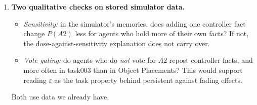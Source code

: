 \documentclass[10pt,a4paper]{article}
\begin{document}
\begin{enumerate}
\begin{itemize}
  \item \emph{What:} make a handful of representative facts finite: integer numbers of holders and board copies, which
    can reach zero.
  \item \emph{Why:} two mismatches in Table~\ref{tab:cmp} are finite-size effects in the simulator (Phase~C1):
    \begin{itemize}
    \item the lasting residual after removal, caused by extinction of agents' own facts;
    \item the slow fading of persistence, caused by selection removing the controller's facts one by one.
    \end{itemize}
    A two-class mean field can show neither.
  \item \emph{Test:} does the finite version give a nonzero residual after removal, and a decline over tens of time
    units instead of a plateau within 5--9?
  \end{itemize}
\item \textbf{Two qualitative checks on stored simulator data.}
  \begin{itemize}
  \item \emph{Sensitivity:} in the simulator's memories, does adding one controller fact change $P(A2)$ less for agents
    who hold more of their own facts? If not, the dose-against-sensitivity explanation does not carry over.
  \item \emph{Vote gating:} do agents who do \emph{not} vote for $A2$ repost controller facts, and more often in task003
    than in Object Placements? This would support reading $\varepsilon$ as the task property behind persistent against
    fading effects.
  \end{itemize}
  Both use data we already have.
\end{enumerate}
\end{document}
